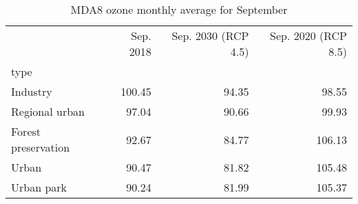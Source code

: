 \begin{table}
\centering
\caption{MDA8 ozone monthly average for September}
\label{o3_sep_type}
\begin{tabular}{lrrr}
\toprule
{} &  Sep. 2018 &  Sep. 2030 (RCP 4.5) &  Sep. 2020 (RCP 8.5) \\
type                &            &                      &                      \\
\midrule
Industry            &     100.45 &                94.35 &                98.55 \\
Regional urban      &      97.04 &                90.66 &                99.93 \\
Forest preservation &      92.67 &                84.77 &               106.13 \\
Urban               &      90.47 &                81.82 &               105.48 \\
Urban park          &      90.24 &                81.99 &               105.37 \\
\bottomrule
\end{tabular}
\end{table}

